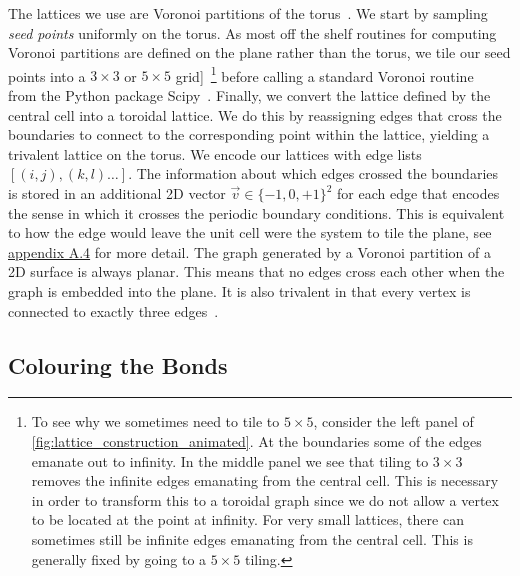 The lattices we use are Voronoi partitions of the torus~\autocite{mitchellAmorphousTopologicalInsulators2018,marsalTopologicalWeaireThorpeModels2020,florescu_designer_2009}. We start by sampling \emph{seed points} uniformly on the torus. As most off the shelf routines for computing Voronoi partitions are defined on the plane rather than the torus, we tile our seed points into a \(3\times3\) or \(5\times5\) grid{]}~\footnote{To see why we sometimes need to tile to \(5\times 5\), consider the left panel of \cref{fig:lattice_construction_animated}. At the boundaries some of the edges emanate out to infinity. In the middle panel we see that tiling to \(3\times 3\) removes the infinite edges emanating from the central cell. This is necessary in order to transform this to a toroidal graph since we do not allow a vertex to be located at the point at infinity. For very small lattices, there can sometimes still be infinite edges emanating from the central cell. This is generally fixed by going to a \(5\times 5\) tiling.} before calling a standard Voronoi routine~\autocite{barberQuickhullAlgorithmConvex1996} from the Python package Scipy~\autocite{virtanenSciPyFundamentalAlgorithms2020}. Finally, we convert the lattice defined by the central cell into a toroidal lattice. We do this by reassigning edges that cross the boundaries to connect to the corresponding point within the lattice, yielding a trivalent lattice on the torus. We encode our lattices with edge lists \([(i,j), (k,l)\ldots]\). The information about which edges crossed the boundaries is stored in an additional 2D vector \(\vec{v} \in \{-1,0,+1\}^2\) for each edge that encodes the sense in which it crosses the periodic boundary conditions. This is equivalent to how the edge would leave the unit cell were the system to tile the plane, see \protect\hyperlink{app-lattice-generation}{appendix A.4} for more detail. The graph generated by a Voronoi partition of a 2D surface is always planar. This means that no edges cross each other when the graph is embedded into the plane. It is also trivalent in that every vertex is connected to exactly three edges~\autocite{voronoiNouvellesApplicationsParamètres1908,watsonComputingNdimensionalDelaunay1981}.

\hypertarget{colouring-the-bonds}{%
\subsection{Colouring the Bonds}\label{colouring-the-bonds}}

